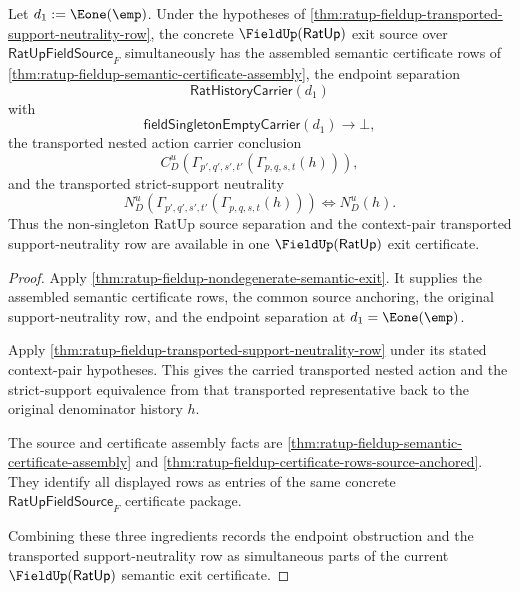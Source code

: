 \begin{theorem}
\label{thm:ratup-fieldup-transported-nondegenerate-semantic-exit}
Let $d_1:=\Eone(\emp)$. Under the hypotheses of
\autoref{thm:ratup-fieldup-transported-support-neutrality-row}, the concrete
$\FieldUp(\mathsf{RatUp})$ exit source over $\mathsf{RatUpFieldSource}_F$
simultaneously has the assembled semantic certificate rows of
\autoref{thm:ratup-fieldup-semantic-certificate-assembly}, the endpoint
separation
$$
\mathsf{RatHistoryCarrier}(d_1)
$$
with
$$
\mathsf{fieldSingletonEmptyCarrier}(d_1)\to\bot,
$$
the transported nested action carrier conclusion
$$
C_D^u(\Gamma_{p',q',s',t'}(\Gamma_{p,q,s,t}(h))),
$$
and the transported strict-support neutrality
$$
N_D^u(\Gamma_{p',q',s',t'}(\Gamma_{p,q,s,t}(h)))
\Longleftrightarrow
N_D^u(h).
$$
Thus the non-singleton RatUp source separation and the context-pair transported
support-neutrality row are available in one $\FieldUp(\mathsf{RatUp})$ exit
certificate.
\end{theorem}
\begin{proof}
Apply \autoref{thm:ratup-fieldup-nondegenerate-semantic-exit}. It supplies the
assembled semantic certificate rows, the common source anchoring, the original
support-neutrality row, and the endpoint separation at
$d_1=\Eone(\emp)$.

Apply \autoref{thm:ratup-fieldup-transported-support-neutrality-row} under its
stated context-pair hypotheses. This gives the carried transported nested
action and the strict-support equivalence from that transported representative
back to the original denominator history $h$.

The source and certificate assembly facts are
\autoref{thm:ratup-fieldup-semantic-certificate-assembly} and
\autoref{thm:ratup-fieldup-certificate-rows-source-anchored}. They identify all
displayed rows as entries of the same concrete $\mathsf{RatUpFieldSource}_F$
certificate package.

Combining these three ingredients records the endpoint obstruction and the
transported support-neutrality row as simultaneous parts of the current
$\FieldUp(\mathsf{RatUp})$ semantic exit certificate.
\end{proof}
